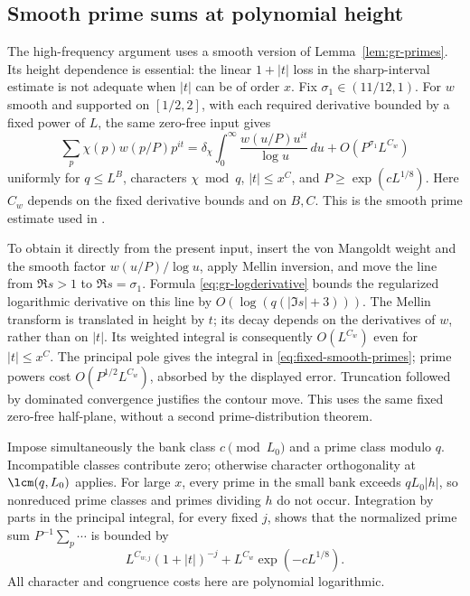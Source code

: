 \subsection{Smooth prime sums at polynomial height}


The high-frequency argument uses a smooth version of
Lemma~\ref{lem:gr-primes}. Its height dependence is essential:
the linear \(1+|t|\) loss in the sharp-interval estimate is not
adequate when \(|t|\) can be of order \(x\).
Fix \(\sigma_1\in(11/12,1)\). For \(w\) smooth and supported on
\([1/2,2]\), with each required derivative bounded by a fixed
power of \(L\), the same zero-free input gives
\begin{equation}\label{eq:fixed-smooth-primes}
 \sum_p\chi(p)w(p/P)p^{it}
  =\delta_\chi\int_0^\infty\frac{w(u/P)u^{it}}{\log u}\,du
                       +O(P^{\sigma_1}L^{C_w})
\end{equation}
uniformly for \(q\le L^B\), characters \(\chi\bmod q\),
\(|t|\le x^C\), and \(P\ge\exp(cL^{1/8})\).
Here \(C_w\) depends on the fixed derivative bounds and on \(B,C\).
This is the smooth prime estimate used in
\cite[Lemma 5.1 and Section 6.4]{walsh}.

To obtain it directly from the present input, insert the von
Mangoldt weight and the smooth factor \(w(u/P)/\log u\), apply
Mellin inversion, and move the line from \(\Re s>1\) to
\(\Re s=\sigma_1\). Formula \eqref{eq:gr-logderivative} bounds
the regularized logarithmic derivative on this line by
\(O(\log(q(|\Im s|+3)))\). The Mellin transform is translated
in height by \(t\); its decay depends on the derivatives of
\(w\), rather than on \(|t|\). Its weighted integral is consequently
\(O(L^{C_w})\) even for \(|t|\le x^C\). The principal pole
gives the integral in \eqref{eq:fixed-smooth-primes}; prime powers
cost \(O(P^{1/2}L^{C_w})\), absorbed by the displayed error.
Truncation followed by dominated convergence justifies the contour
move. This uses the same fixed zero-free half-plane, without a
second prime-distribution theorem.

Impose simultaneously the bank class \(c\pmod{L_0}\) and a
prime class modulo \(q\). Incompatible classes contribute zero;
otherwise character orthogonality at \(\lcm(q,L_0)\) applies.
For large \(x\), every prime in the small bank exceeds
\(qL_0|h|\), so nonreduced prime classes and primes dividing
\(h\) do not occur. Integration by parts in the principal
integral, for every fixed \(j\), shows that the normalized
prime sum \(P^{-1}\sum_p\cdots\) is bounded by
\begin{equation}\label{eq:fixed-high-prime}
        L^{C_{w,j}}(1+|t|)^{-j}
                       +L^{C_w}\exp(-cL^{1/8}).
\end{equation}
All character and congruence costs here are polynomial logarithmic.

